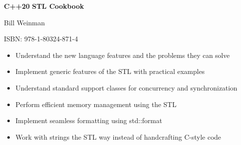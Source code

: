 
\textbf{C++20} \textbf{STL Cookbook}

Bill Weinman

ISBN: 978-1-80324-871-4

\begin{itemize}
\item
  Understand the new language features and the problems they can solve
\item
  Implement generic features of the STL with practical examples
\item
  Understand standard support classes for concurrency and synchronization
\item
  Perform efficient memory management using the STL
\item
  Implement seamless formatting using std::format
\item
  Work with strings the STL way instead of handcrafting C-style code
\end{itemize}


